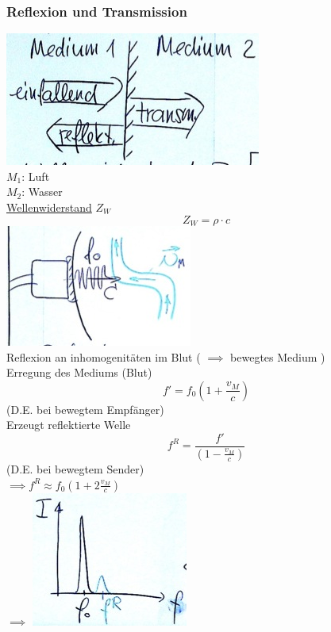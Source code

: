 \subsubsection{Reflexion und Transmission}
\includegraphics{Bild239} \\
$M_1$: Luft \\
$M_2$: Wasser \\
\uline{Wellenwiderstand} $Z_W$
\[ \boxed{ Z_W = \rho \cdot c } \]
\includegraphics{Bild240} \\
Reflexion an inhomogenitäten im Blut ( $\implies$ bewegtes Medium ) \\
Erregung des Mediums (Blut)
\[ f' = f_0 \left( 1 + \frac{v_M}{c} \right) \]
(D.E. bei bewegtem Empfänger) \\
Erzeugt reflektierte Welle
\[ f^R = \frac{f'}{\left( 1 - \frac{v_M}{c} \right) } \]
(D.E. bei bewegtem Sender) \\
$\implies f^R \approx f_0 \left( 1 + 2 \frac{v_M}{c} \right)$ \\
$\implies$ \includegraphics{Bild241}

